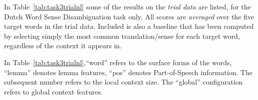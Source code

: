 
In Table~\ref{tab:task3trialnl} some of the results on the \emph{trial data}
are listed, for the Dutch Word Sense Disambiguation task only.  All scores are
\emph{averaged} over the five target words in the trial data. Included is also
a baseline that has been computed by selecting simply the most common
translation/sense for each target word, regardless of the context it appears
in.

\begin{table}
\label{tab:task3trialnl}
\footnotesize{
\noindent{}
\caption{Average scores for various configurations on the trial data of the English-\emph{Dutch} Word Sense Disambiguation
    task, averaged over five target words. At the time this experiment was conducted, a bug existed in the output format specification, resulting in slightly lower scores.}
}
\end{table}

In Table~\ref{tab:task3trialnl},``word'' refers to the surface forms of the
words, ``lemma'' denotes lemma features, ``pos'' denotes Part-of-Speech
information. The subsequent number refers to the local context size. The
``global'' configuration refers to global context features.

